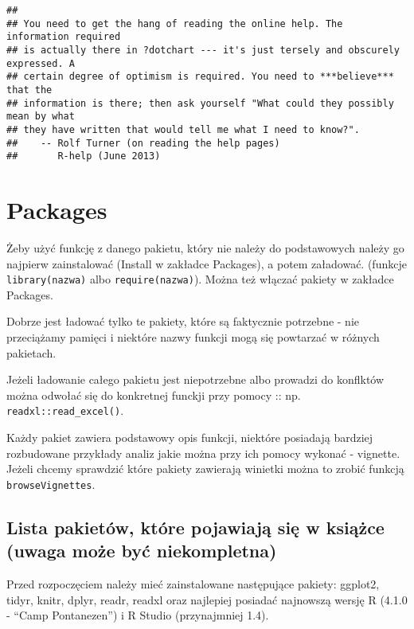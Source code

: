 \documentclass[
]{book}
\begin{document}
\begin{verbatim}
## 
## You need to get the hang of reading the online help. The information required
## is actually there in ?dotchart --- it's just tersely and obscurely expressed. A
## certain degree of optimism is required. You need to ***believe*** that the
## information is there; then ask yourself "What could they possibly mean by what
## they have written that would tell me what I need to know?".
##    -- Rolf Turner (on reading the help pages)
##       R-help (June 2013)
\end{verbatim}

\hypertarget{packages}{%
\section{Packages}\label{packages}}

Żeby użyć funkcję z danego pakietu, który nie należy do podstawowych należy go najpierw zainstalować (Install w zakładce Packages), a potem załadować.
(funkcje \texttt{library(nazwa)} albo \texttt{require(nazwa)}). Można też włączać pakiety w zakładce Packages.

Dobrze jest ładować tylko te pakiety, które są faktycznie potrzebne - nie przeciążamy pamięci i niektóre nazwy funkcji mogą się powtarzać w różnych pakietach.

Jeżeli ładowanie całego pakietu jest niepotrzebne albo prowadzi do konflktów można odwołać się do konkretnej funckji przy pomocy :: np. \texttt{readxl::read\_excel()}.

Każdy pakiet zawiera podstawowy opis funkcji, niektóre posiadają bardziej rozbudowane przykłady analiz jakie można przy ich pomocy wykonać - vignette. Jeżeli chcemy sprawdzić które pakiety zawierają winietki można to zrobić funkcją \texttt{browseVignettes}.

\hypertarget{lista-pakietuxf3w-ktuxf3re-pojawiajux105-siux119-w-ksiux105ux17cce-uwaga-moux17ce-byux107-niekompletna}{%
\subsection{Lista pakietów, które pojawiają się w książce (uwaga może być niekompletna)}\label{lista-pakietuxf3w-ktuxf3re-pojawiajux105-siux119-w-ksiux105ux17cce-uwaga-moux17ce-byux107-niekompletna}}

Przed rozpoczęciem należy mieć zainstalowane następujące pakiety: ggplot2, tidyr, knitr, dplyr, readr, readxl oraz najlepiej posiadać najnowszą wersję R (4.1.0 - ``Camp Pontanezen'') i R Studio (przynajmniej 1.4).
\end{document}
